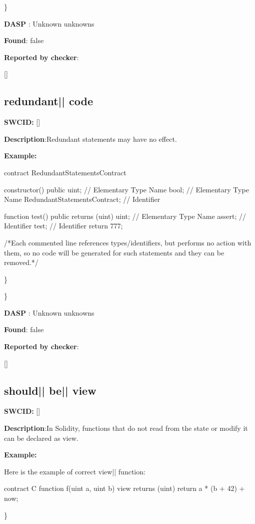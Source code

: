 \documentclass{article}
\begin{document}
\} 

\textbf{DASP} : Unknown unknowns

\textbf{Found}: false

\textbf{Reported by checker}: 
\begin{ffcode} 

[]
\end{ffcode} 
\subsection{redundant{|\textunderscore| }code} 
\textbf{SWC{\textunderscore }ID:} []

\textbf{Description}:Redundant statements may have no effect.


\textbf{Example:} 
\begin{ffcode} 

contract RedundantStatementsContract {

    constructor() public {
        uint; // Elementary Type Name
        bool; // Elementary Type Name
        RedundantStatementsContract; // Identifier
    }

    function test() public returns (uint) {
        uint; // Elementary Type Name
        assert; // Identifier
        test; // Identifier
        return 777;
    }
}

 /*Each commented line references types/identifiers, but performs no action with them, so no code will be generated for such statements and they can be removed.*/ 

\end{ffcode} 
\} 

\} 

\textbf{DASP} : Unknown unknowns

\textbf{Found}: false

\textbf{Reported by checker}: 
\begin{ffcode} 

[]
\end{ffcode} 
\subsection{should{|\textunderscore| }be{|\textunderscore| }view} 
\textbf{SWC{\textunderscore }ID:} []

\textbf{Description}:In Solidity, functions that do not read from the state or modify it can be declared as view.


\textbf{Example:} 
\begin{ffcode} 

Here is the example of correct view|\textendash| function:

contract C {
    function f(uint a, uint b) view returns (uint) {
        return a * (b + 42) + now;
    }
}

\end{ffcode} 
\} 
\end{document}
